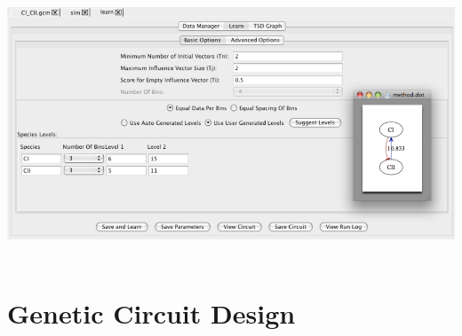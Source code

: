 \documentclass[titlepage,11pt]{article}
\begin{document}
\begin{enumerate}
\includegraphics[height=80mm]{screenshots/learn}
\end{enumerate}
 
\clearpage

\section{Genetic Circuit Design}
\end{document}
